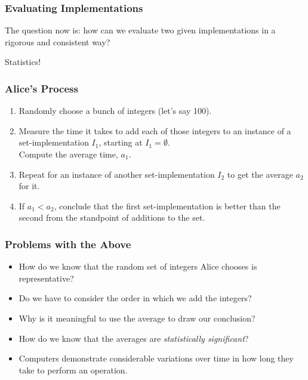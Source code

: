 \begin{frame}
\frametitle{Evaluating Implementations}
\begin{changemargin}{1cm}

The question now is: how can we evaluate two given implementations in a rigorous and consistent way?

Statistics!

\end{changemargin}
\end{frame}

\begin{frame}
\frametitle{Alice's Process}
\begin{changemargin}{1cm}

\begin{enumerate}
\item Randomly choose a bunch of integers (let's say 100).

\item Measure the time it takes to add each of
those integers to an instance of a set-implementation $I_1$,
starting at $I_1 = \emptyset$.\\ Compute the average time, $a_1$.

\item Repeat for an instance of another set-implementation
$I_2$ to get the average $a_2$ for it.

\item If $a_1 < a_2$, conclude that the first set-implementation
is better than the second from the standpoint of additions to the set.
\end{enumerate}

\end{changemargin}
\end{frame}

\begin{frame}
\frametitle{Problems with the Above}
\begin{changemargin}{1cm}

\begin{itemize}
    \item How do we know that the random set of integers Alice chooses
	is representative?
    \item Do we have to consider the order in which we add
	the integers?
    \item Why is it meaningful to use the average to draw our
	conclusion?
    \item How do we know that the averages are \emph{statistically
	significant}? 
    \item Computers demonstrate considerable variations over
	time in how long they take to perform an operation.
\end{itemize}

\end{changemargin}
\end{frame}

